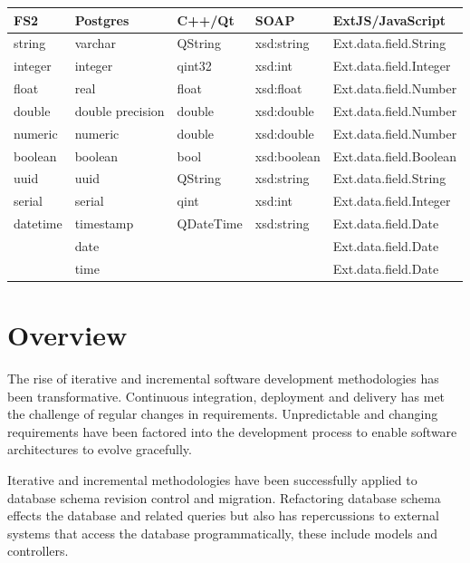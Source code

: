\documentclass[]{article}
\begin{document}
\begin{tabular}{|l|l|l|l|l|}
	\hline
	FS2 & Postgres         & C++/Qt & SOAP        & ExtJS/JavaScript         \\
	\hline
	\hline
	string       & varchar          & QString         & xsd:string  & Ext.data.field.String    \\
	integer      & integer          & qint32          & xsd:int     & Ext.data.field.Integer   \\
	float        & real             & float           & xsd:float   & Ext.data.field.Number    \\
	double       & double precision & double          & xsd:double  & Ext.data.field.Number    \\
	numeric      & numeric          & double          & xsd:double  & Ext.data.field.Number    \\
	boolean      & boolean          & bool            & xsd:boolean & Ext.data.field.Boolean   \\
	uuid         & uuid             & QString         & xsd:string  & Ext.data.field.String    \\
	serial       & serial           & qint            & xsd:int     & Ext.data.field.Integer   \\
	datetime     & timestamp        & QDateTime       & xsd:string  & Ext.data.field.Date      \\
	& date             &                 &             & Ext.data.field.Date      \\
	& time             &                 &             & Ext.data.field.Date      \\
	\hline
\end{tabular}

\section{Overview}
The rise of iterative and incremental software development methodologies has been transformative. Continuous integration\cite{ci}, deployment and delivery\cite{cd,cidd} has met the challenge of regular changes in requirements. Unpredictable and changing requirements\cite{bea} have been factored into the development process to enable software architectures to evolve gracefully.

Iterative and incremental methodologies have been successfully applied to database schema revision control and migration\cite{rd}. Refactoring database schema effects the database and related queries but also has repercussions to external systems that access the database programmatically, these include models and controllers. 
\end{document}
